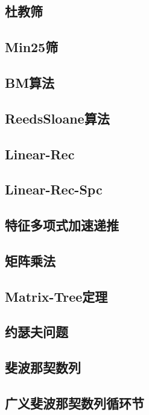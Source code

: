 \documentclass{article}
\begin{document}
\subsection{杜教筛} 

\subsection{Min25筛} 


\subsection{BM算法} 

\subsection{ReedsSloane算法} 

\subsection{Linear-Rec} 

\subsection{Linear-Rec-Spc} 

\subsection{特征多项式加速递推} 

\subsection{矩阵乘法} 

\subsection{Matrix-Tree定理} 


\subsection{约瑟夫问题} 

\subsection{斐波那契数列} 

\subsection{广义斐波那契数列循环节} 

\end{document}
